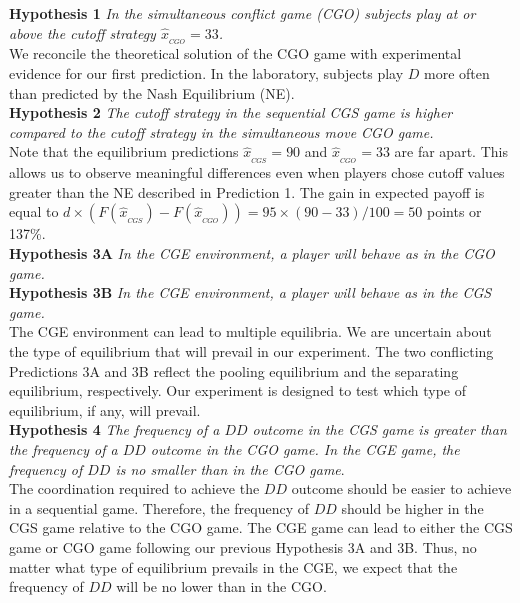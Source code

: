 \documentclass[12pt, letterpaper]{article}
\theoremstyle{plain}
\begin{document}
\noindent \textbf{Hypothesis 1}
\textit{In the simultaneous conflict game (CGO) subjects play at or above the cutoff strategy $\hat{x}_{_{CGO}}=33$.}\\

We reconcile the theoretical solution of the CGO game with experimental evidence for our first prediction. In the laboratory, subjects play $D$ more often than predicted by the Nash Equilibrium (NE). \\

\noindent \textbf{Hypothesis 2}
\textit{The cutoff strategy in the sequential CGS game is higher compared to the cutoff strategy in the simultaneous move CGO game.}\\

Note that the equilibrium predictions $\hat{x}_{_{CGS}}=90$ and $\hat{x}_{_{CGO}}=33$ are far apart. This allows us to observe meaningful differences even when players chose cutoff values greater than the NE described in Prediction 1. The gain in expected payoff is equal to $d\times \left( F(\hat{x}_{_{CGS}})-F(\hat{x}_{_{CGO}}) \right)=95\times( 90-33)/100=50$ points or 137\%. \\

\noindent \textbf{Hypothesis 3A} \textit{In the CGE environment, a player will behave as in the CGO game. }\\
\noindent \textbf{Hypothesis 3B} \textit{In the CGE environment, a player will behave as in the CGS game.}\\

The CGE environment can lead to multiple equilibria. We are uncertain about the type of equilibrium that will prevail in our experiment. The two conflicting Predictions 3A and 3B reflect the pooling equilibrium and the separating equilibrium, respectively. Our experiment is designed to test which type of equilibrium, if any, will prevail. \\

\noindent \textbf{Hypothesis 4}
\textit{The frequency of a $DD$ outcome in the CGS game is greater than the frequency of a $DD$ outcome in the CGO game. In the CGE game, the frequency of $DD$ is no smaller than in the CGO game}.\\

The coordination required to achieve the $DD$ outcome should be easier to achieve in a sequential game. Therefore, the frequency of $DD$ should be higher in the CGS game relative to the CGO game. The CGE game can lead to either the CGS game or CGO game following our previous Hypothesis 3A and 3B. Thus, no matter what type of equilibrium prevails in the CGE, we expect that the frequency of $DD$ will be no lower than in the CGO.\\
\end{document}
